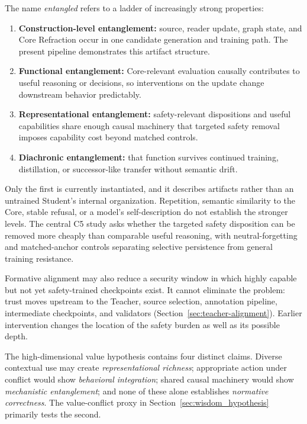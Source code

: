 \documentclass[11pt]{article}
\begin{document}
		The name \emph{entangled} refers to a ladder of increasingly strong properties:
		\begin{enumerate}
			\item \textbf{Construction-level entanglement:} source, reader update, graph state, and Core Refraction occur in one candidate generation and training path. The present pipeline demonstrates this artifact structure.
			\item \textbf{Functional entanglement:} Core-relevant evaluation causally contributes to useful reasoning or decisions, so interventions on the update change downstream behavior predictably.
			\item \textbf{Representational entanglement:} safety-relevant dispositions and useful capabilities share enough causal machinery that targeted safety removal imposes capability cost beyond matched controls.
			\item \textbf{Diachronic entanglement:} that function survives continued training, distillation, or successor-like transfer without semantic drift.
		\end{enumerate}
		Only the first is currently instantiated, and it describes artifacts rather than an untrained Student's internal organization. Repetition, semantic similarity to the Core, stable refusal, or a model's self-description do not establish the stronger levels. The central C5 study asks whether the targeted safety disposition can be removed more cheaply than comparable useful reasoning, with neutral-forgetting and matched-anchor controls separating selective persistence from general training resistance.

		Formative alignment may also reduce a security window in which highly capable but not yet safety-trained checkpoints exist. It cannot eliminate the problem: trust moves upstream to the Teacher, source selection, annotation pipeline, intermediate checkpoints, and validators (Section~\ref{sec:teacher-alignment}). Earlier intervention changes the location of the safety burden as well as its possible depth.

		The high-dimensional value hypothesis contains four distinct claims. Diverse contextual use may create \emph{representational richness}; appropriate action under conflict would show \emph{behavioral integration}; shared causal machinery would show \emph{mechanistic entanglement}; and none of these alone establishes \emph{normative correctness}. The value-conflict proxy in Section~\ref{sec:wisdom_hypothesis} primarily tests the second.
\end{document}
